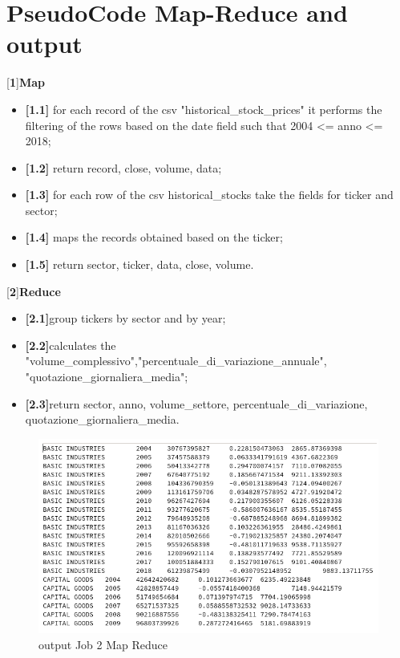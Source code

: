 \documentclass[]{report}
\begin{document}
\section*{PseudoCode Map-Reduce and output}
[\textbf{1}]\textbf{Map}\begin{itemize}
	\item \textbf{[1.1]}  for each record of the csv "historical\_stock\_prices" it performs the filtering of the rows based on the date field such that 2004 <= anno <= 2018;
	\item \textbf{[1.2]} return record, close, volume, data;
	\item \textbf{[1.3]} for each row of the csv historical\_stocks take the fields for ticker and sector;
	\item \textbf{[1.4]} maps the records obtained based on the ticker;
	\item \textbf{[1.5]} return sector, ticker, data, close, volume.
\end{itemize}
[\textbf{2}]\textbf{Reduce} \begin{itemize}
	\item \textbf{[2.1]}group tickers by sector and by year;
	\item \textbf{[2.2]}calculates the "volume\_complessivo","percentuale\_di\_variazione\_annuale", "quotazione\_giornaliera\_media";
	\item \textbf{[2.3]}return sector, anno, volume\_settore, percentuale\_di\_variazione,	quotazione\_giornaliera\_media.
\end{itemize}

\begin{center}
	\begin{figure}[!htb]
		\hspace{-1 cm}
		\includegraphics[width=1.2 \linewidth]{figure/output2map}
		\caption{output Job 2 Map Reduce}
	\end{figure}
\end{center}
\end{document}
